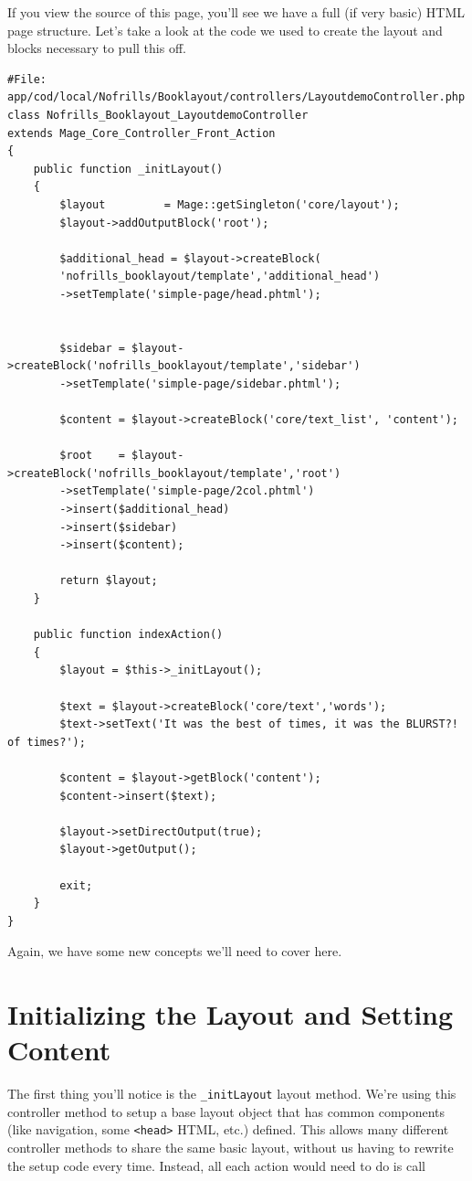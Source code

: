 \documentclass[oneside]{book}
\begin{document}
If you view the source of this page, you'll see we have a full (if very basic) HTML page structure.  Let's take a look at the code we used to create the layout and blocks necessary to pull this off.

\begin{lstlisting}
#File: app/cod/local/Nofrills/Booklayout/controllers/LayoutdemoController.php
class Nofrills_Booklayout_LayoutdemoController
extends Mage_Core_Controller_Front_Action
{
    public function _initLayout()
    {
        $layout         = Mage::getSingleton('core/layout');
        $layout->addOutputBlock('root');

        $additional_head = $layout->createBlock(
        'nofrills_booklayout/template','additional_head')
        ->setTemplate('simple-page/head.phtml');


        $sidebar = $layout->createBlock('nofrills_booklayout/template','sidebar')
        ->setTemplate('simple-page/sidebar.phtml');

        $content = $layout->createBlock('core/text_list', 'content');

        $root    = $layout->createBlock('nofrills_booklayout/template','root')
        ->setTemplate('simple-page/2col.phtml')
        ->insert($additional_head)
        ->insert($sidebar)
        ->insert($content);

        return $layout;
    }

    public function indexAction()
    {
        $layout = $this->_initLayout();

        $text = $layout->createBlock('core/text','words');
        $text->setText('It was the best of times, it was the BLURST?! of times?');

        $content = $layout->getBlock('content');
        $content->insert($text);

        $layout->setDirectOutput(true);
        $layout->getOutput();

        exit;
    }
}

\end{lstlisting}


Again, we have some new concepts we'll need to cover here.

\section{Initializing the Layout and Setting Content}

The first thing you'll notice is the \footnotesize\texttt{\_initLayout} \normalsize  layout method.  We're using this controller method to setup a base layout object that has common components (like navigation, some \footnotesize\texttt{\textless head\textgreater } \normalsize  HTML, etc.) defined.   This allows many different controller methods to share the same basic layout, without us having to rewrite the setup code every time.  Instead, all each action would need to do is call
\end{document}
